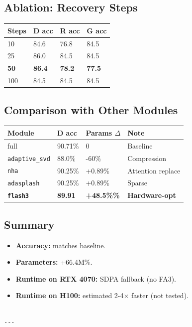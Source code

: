 \subsection{Ablation: Recovery Steps}

\begin{table}[H]
\centering
\small
\begin{tabular}{llll}
\toprule
\textbf{Steps} & \textbf{D acc} & \textbf{R acc} & \textbf{G acc} \\
\midrule
10 & 84.6 & 76.8 & 84.5 \\
25 & 86.0 & 84.5 & 84.5 \\
\textbf{50} & \textbf{86.4} & \textbf{78.2} & \textbf{77.5} \\
100 & 84.5 & 84.5 & 84.5 \\
\bottomrule
\end{tabular}
\end{table}

\subsection{Comparison with Other Modules}

\begin{table}[H]
\centering
\small
\begin{tabular}{llll}
\toprule
\textbf{Module} & \textbf{D acc} & \textbf{Params $\Delta$} & \textbf{Note} \\
\midrule
full & 90.71\% & 0 & Baseline \\
\texttt{adaptive\_svd} & 88.0\% & -60\% & Compression \\
\texttt{nha} & 90.25\% & +0.89\% & Attention replace \\
\texttt{adasplash} & 90.25\% & +0.89\% & Sparse \\
\textbf{\texttt{flash3}} & \textbf{89.91} & \textbf{+48.5\%\%} & \textbf{Hardware-opt} \\
\bottomrule
\end{tabular}
\end{table}

\subsection{Summary}

\begin{itemize}
\item \textbf{Accuracy:} matches baseline.
\item \textbf{Parameters:} +66.4M\%.
\item \textbf{Runtime on RTX 4070:} SDPA fallback (no FA3).
\item \textbf{Runtime on H100:} estimated 2-4$\times$ faster (not tested).
\end{itemize}
\begin{lstlisting}

---
\end{lstlisting}


